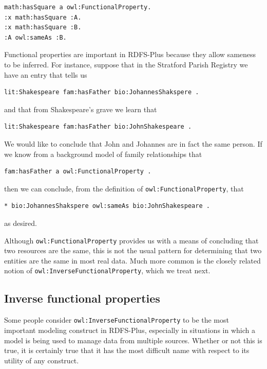 \begin{lstlisting}
math:hasSquare a owl:FunctionalProperty.
:x math:hasSquare :A.
:x math:hasSquare :B.
:A owl:sameAs :B.
\end{lstlisting}

Functional properties are important in RDFS-Plus because they allow
sameness to be inferred. For instance, suppose that in the Stratford
Parish Registry we have an entry that tells us

\begin{lstlisting}
lit:Shakespeare fam:hasFather bio:JohannesShakspere .
\end{lstlisting}

and that from Shakespeare's grave we learn that

\begin{lstlisting}
lit:Shakespeare fam:hasFather bio:JohnShakespeare .
\end{lstlisting}

We would like to conclude that John and Johannes are in fact the same
person. If we know from a background model of family relationships that

\begin{lstlisting}
fam:hasFather a owl:FunctionalProperty .
\end{lstlisting}

then we can conclude, from the definition of \texttt{owl:FunctionalProperty},
that

\begin{lstlisting}
* bio:JohannesShakspere owl:sameAs bio:JohnShakespeare .
\end{lstlisting}

as desired.

Although \texttt{owl:FunctionalProperty} provides us with a means of concluding
that two resources are the same, this is not the usual pattern for
determining that two entities are the same in most real data. Much more
common is the closely related notion of \texttt{owl:InverseFunctionalProperty},
which we treat next.

\subsection{Inverse functional properties}

Some people consider \texttt{owl:InverseFunctionalProperty} to be the most
important modeling construct in RDFS-Plus, especially in situations in
which a model is being used to manage data from multiple sources.
Whether or not this is true, it is certainly true that it has the most
difficult name with respect to its utility of any construct.

